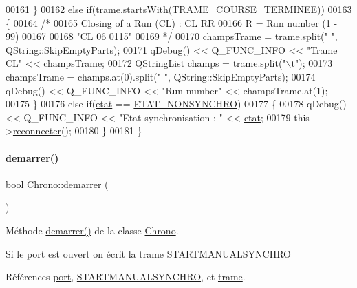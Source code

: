 \begin{DoxyCode}
00161     \}
00162     \textcolor{keywordflow}{else} \textcolor{keywordflow}{if}(trame.startsWith(\hyperlink{chrono_8h_a24bef153968288b19cfda35989658fe1}{TRAME\_COURSE\_TERMINEE}))
00163     \{
00164         \textcolor{comment}{/*}
00165 \textcolor{comment}{            Closing of a Run (CL) : CL RR}
00166 \textcolor{comment}{            R = Run number (1 - 99)}
00167 \textcolor{comment}{}
00168 \textcolor{comment}{            "CL 06  0115"}
00169 \textcolor{comment}{         */}
00170         champsTrame = trame.split(\textcolor{stringliteral}{" "}, QString::SkipEmptyParts);
00171         qDebug() << Q\_FUNC\_INFO << \textcolor{stringliteral}{"Trame CL"} << champsTrame;
00172         QStringList champs = trame.split(\textcolor{stringliteral}{"\(\backslash\)t"});
00173         champsTrame = champs.at(0).split(\textcolor{stringliteral}{" "}, QString::SkipEmptyParts);
00174         qDebug() << Q\_FUNC\_INFO << \textcolor{stringliteral}{"Run number"} << champsTrame.at(1);
00175     \}
00176     \textcolor{keywordflow}{else} \textcolor{keywordflow}{if}(\hyperlink{class_chrono_ad82d4f2a230290aa9695f12bf5ac02e8}{etat} == \hyperlink{chrono_8h_af1a61de8ee28781dbc28e0d7d43c158e}{ETAT\_NONSYNCHRO})
00177     \{
00178         qDebug() << Q\_FUNC\_INFO << \textcolor{stringliteral}{"Etat synchronisation : "} << \hyperlink{class_chrono_ad82d4f2a230290aa9695f12bf5ac02e8}{etat};
00179         this->\hyperlink{class_chrono_a80305a5dae33e8cd99604e809589564b}{reconnecter}();
00180     \}
00181 \}
\end{DoxyCode}
\mbox{\label{class_chrono_a2ee875c24eb14f09011a40dfb3f1921f}} 
\paragraph{\texorpdfstring{demarrer()}{demarrer()}}
{\footnotesize\ttfamily bool Chrono\+::demarrer (\begin{DoxyParamCaption}{ }\end{DoxyParamCaption})}



Méthode \hyperlink{class_chrono_a2ee875c24eb14f09011a40dfb3f1921f}{demarrer()} de la classe \hyperlink{class_chrono}{Chrono}. 

Si le port est ouvert on écrit la trame S\+T\+A\+R\+T\+M\+A\+N\+U\+A\+L\+S\+Y\+N\+C\+H\+RO 

Références \hyperlink{class_chrono_aca5fbe0eebd7f876f954d4a99c564167}{port}, \hyperlink{chrono_8h_a0130f9324a15a83d5609c874891d9d1f}{S\+T\+A\+R\+T\+M\+A\+N\+U\+A\+L\+S\+Y\+N\+C\+H\+RO}, et \hyperlink{class_chrono_a26f2155aa6e5ef4296e5456b64a713b5}{trame}.



